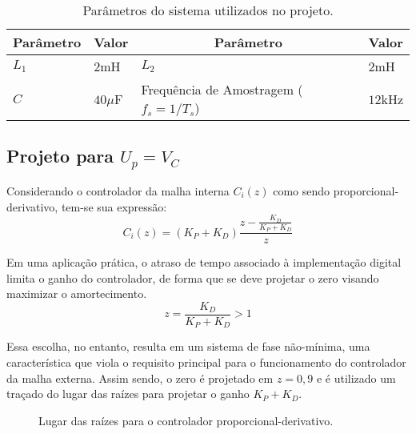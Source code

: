     \begin{table}[htb]
        \renewcommand{\arraystretch}{1.35}
        \setlength{\tabcolsep}{1.2mm}
        \caption{Parâmetros do sistema utilizados no projeto.}
        \label{tab:sim_parameters}
        \centering
        \begin{tabular}{l l l l}
            \hline
            \multicolumn{1}{c}{Parâmetro} & \multicolumn{1}{c}{Valor} &
            \multicolumn{1}{c}{Parâmetro} & \multicolumn{1}{c}{Valor} \\
            \hline
            $L_1$ &  $2$mH      &  $L_2$                                   &  $2$mH    \\
            $C$   &  $40\mu$F   & Frequência de Amostragem ($f_s = 1/T_s$) &  $12$kHz  \\
            \hline
        \end{tabular}
    \end{table}


\subsection{Projeto para $U_p = V_C$}

    Considerando o controlador da malha interna $C_i(z)$ como sendo proporcional-derivativo,
    tem-se sua expressão:
    \begin{equation}
        C_i(z) = \left( K_P + K_D \right) \frac{z- \frac{K_D}{K_P+K_D}}{z}
    \end{equation}

    Em uma aplicação prática, o atraso de tempo associado à implementação digital limita o
    ganho do controlador, de forma que se deve projetar o zero visando maximizar o amortecimento.
    \begin{equation}
        z = \frac{K_D}{K_P+K_D} > 1
    \end{equation}

    Essa escolha, no entanto, resulta em um sistema de fase não-mínima, uma característica
    que viola o requisito principal para o funcionamento do controlador da malha externa. Assim
    sendo, o zero é projetado em $z=0,9$ e é utilizado um traçado do lugar das raízes para projetar
    o ganho $K_P+K_D$.

    \begin{figure}[htb]
        \centering{
            }%
        \renewcommand\figurename{Fig.}
        \caption{Lugar das raízes para o controlador proporcional-derivativo.}
        \label{fig:rlocus_vc_2}
    \end{figure}

